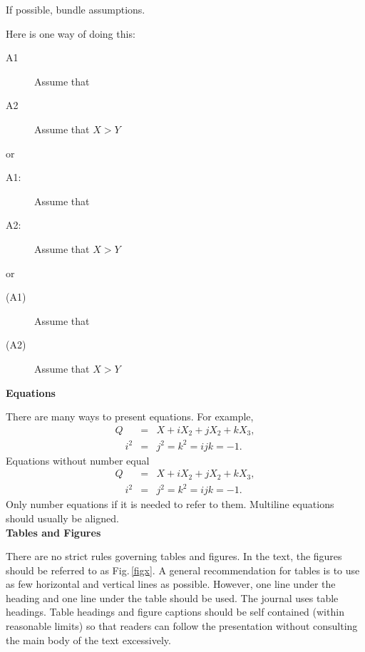 \documentclass[a4paper,fleqn]{cas-sc} %
\begin{document}
If possible, bundle assumptions.

\begin{assumption} Here is one way of doing this:
\begin{description}
\item[{\rm A1}\phantom{A2}] Assume that
\item[{\rm A2}\phantom{A1}] Assume that $X>Y$ 
\end{description}
\end{assumption}
 
 or
\begin{description}
\item[{\rm A1:}\phantom{A2}] Assume that
\item[{\rm A2:}\phantom{A1}] Assume that $X>Y$ 
\end{description}

or
\begin{description}
\item[{\rm (A1)}\phantom{A2}] Assume that
\item[{\rm (A2)}\phantom{A1}] Assume that $X>Y$ 
\end{description}
\textbf{Equations}

There are many ways to present equations. For example,
\begin{eqnarray}\label{eq1}
Q&=&X+iX_2+jX_2+kX_3,\\\label{eq2}
\quad i^2&=&j^2=k^2=ijk=-1.
\end{eqnarray}
Equations without number equal 
\begin{eqnarray*}
Q&=&X+iX_2+jX_2+kX_3,\\
\quad i^2&=&j^2=k^2=ijk=-1.
\end{eqnarray*}
Only number equations if it is needed to refer to them. Multiline equations should usually be aligned.\\

\smallskip\noindent
\textbf{Tables and Figures}

There are no strict rules governing tables and figures. In the text, the figures should be referred to as Fig.\,\ref{figx}. A general recommendation for tables is to use as few horizontal and vertical lines as possible. However, one line under the heading and one line under the table should be used. The journal uses table headings. Table headings and figure captions should be self contained (within reasonable limits) so that readers can follow the presentation without consulting the main body of the text excessively.
\end{document}
